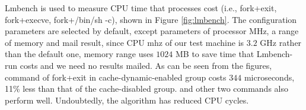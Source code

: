 Lmbench is used to measure CPU time that processes cost (i.e., fork+exit, fork+execve, fork+/bin/sh -c), shown in Figure \ref{fig:lmbench}. The configuration parameters are selected by default, except parameters of processor MHz, a range of memory and mail result, since CPU mhz of our test machine is $3.2$ GHz rather than the default one, memory range uses $1024$ MB to save time that Lmbench-run costs and we need no results mailed. As can be seen from the figures, command of fork+exit in cache-dynamic-enabled group costs $344$ microseconds, 11\% less than that of the cache-disabled group. and other two commands also perform well. Undoubtedly, the algorithm has reduced CPU cycles.










